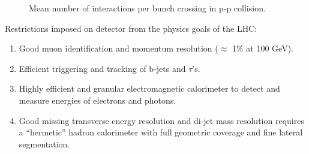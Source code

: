 {{{\begin{figure}[!htbp]
	\caption{Mean number of interactions per bunch crossing in p-p collision.}
	\label{fig:pile-up}
\end{figure}
Restrictions imposed on detector from the physics goals of the LHC:
\begin{enumerate}
	\item Good muon identification and momentum resolution ($\approx$ 1\% at 100 GeV).
	\item Efficient triggering and tracking of b-jets and $\tau$'s.
	\item Highly efficient and granular electromagnetic calorimeter to detect and measure energies of electrons and photons.
	\item Good missing transverse energy resolution and di-jet mass resolution requires a ``hermetic'' hadron calorimeter with full geometric coverage and fine lateral segmentation.
\end{enumerate}

}}}
